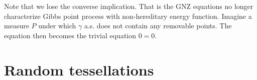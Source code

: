 Note that we lose the converse implication. That is the GNZ equations no longer characterize Gibbs point process with non-hereditary energy function. Imagine a measure $P$ under which $\gamma$ a.s. does not contain any removable points. The equation then becomes the trivial equation $0=0$.





\section{Random tessellations}
